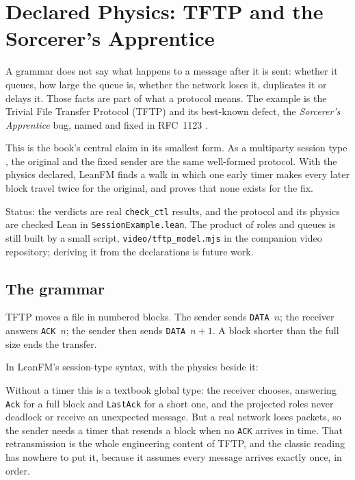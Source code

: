 \chapter{Declared Physics: TFTP and the Sorcerer's Apprentice}
\label{ch:tftp-physics}

A grammar does not say what happens to a message after it is sent: whether it
queues, how large the queue is, whether the network loses it, duplicates it or
delays it. Those facts are part of what a protocol means. The example is the
Trivial File Transfer Protocol (TFTP) \citep{rfc783,rfc1350} and its best-known
defect, the \emph{Sorcerer's Apprentice} bug, named and fixed in RFC~1123
\citep{rfc1123}.

This is the book's central claim in its smallest form. As a multiparty session type
\citep{honda2008multiparty}, the original and the fixed sender are the same
well-formed protocol. With the physics declared, LeanFM finds a walk in which one
early timer makes every later block travel twice for the original, and proves
that none exists for the fix.

Status: the verdicts are real \texttt{check\_ctl} results, and the protocol and
its physics are checked Lean in \texttt{SessionExample.lean}. The product of roles
and queues is still built by a small script, \texttt{video/tftp\_model.mjs} in
the companion video repository; deriving it from the declarations is future work.

\section{The grammar}

TFTP moves a file in numbered blocks. The sender sends \texttt{DATA}~$n$; the
receiver answers \texttt{ACK}~$n$; the sender then sends \texttt{DATA}~$n{+}1$.
A block shorter than the full size ends the transfer.

In LeanFM's session-type syntax, with the physics beside it:



Without a timer this is a textbook global type: the receiver chooses,
answering \texttt{Ack} for a full block and \texttt{LastAck} for a short one, and
the projected roles never deadlock or receive an unexpected message. But a real
network loses packets, so the sender needs a timer that resends a block when no
\texttt{ACK} arrives in time. That retransmission is the whole engineering content
of TFTP, and the classic reading has nowhere to put it, because it assumes every
message arrives exactly once, in order.

